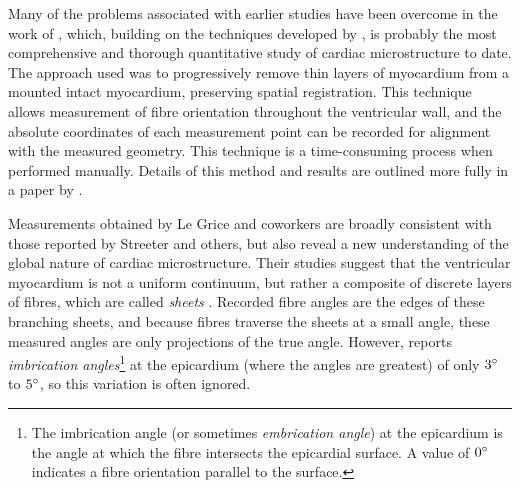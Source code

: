 Many of the problems associated with earlier studies have been overcome in the
work of , which, building on the techniques developed
by , is probably the most comprehensive and thorough
quantitative study of cardiac microstructure to date.
The approach used was to progressively remove thin layers of myocardium from a
mounted intact myocardium, preserving spatial registration.  This technique
allows measurement of fibre orientation throughout the ventricular wall, and
the absolute coordinates of each measurement point can be recorded for
alignment with the measured geometry.  This technique is a time-consuming
process when performed manually.  Details of this method and results are
outlined more fully in a paper by .

Measurements obtained by Le Grice and coworkers are broadly consistent with
those reported by Streeter and others, but also reveal a new understanding of
the global nature of cardiac microstructure.  Their studies suggest that the
ventricular myocardium is not a uniform continuum, but rather a composite of
discrete layers of fibres, which are called \emph{sheets}
\cite{legrice:1992,legrice:1995a,smaill:glass:1991}.  Recorded fibre angles
are the edges of these branching sheets, and because fibres traverse the
sheets at a small angle, these measured angles are only projections of the
true angle.  However,  reports \emph{imbrication
  angles}\footnote{The imbrication angle (or sometimes \emph{embrication
    angle}) at the epicardium is the angle at which the fibre intersects the
  epicardial surface.  A value of $0^{\circ}$ indicates a fibre orientation
  parallel to the surface.} at the epicardium (where the angles are greatest)
of only $3^{\circ}$ to $5^{\circ}$, so this variation is often ignored.

